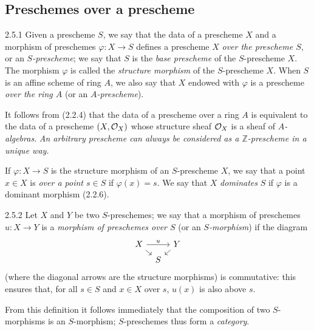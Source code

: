 \documentclass[../main.tex]{subfiles}
\begin{document}
\subsection{Preschemes over a prescheme}

\begin{cx}[Definition]{2.5.1}
    Given a prescheme $S$, we say that the data of a prescheme $X$ and a morphism of preschemes $\varphi\colon X\to S$ defines a prescheme $X$ \emph{over the prescheme $S$}, or an \emph{$S$-prescheme}; we say that $S$ is the \emph{base prescheme} of the $S$-prescheme $X$.
    The morphism $\varphi$ is called the \emph{structure morphism} of the $S$-prescheme $X$.
    When $S$ is an affine scheme of ring $A$, we also say that $X$ endowed with $\varphi$ is a prescheme \emph{over the ring $A$} (or an \emph{$A$-prescheme}).
\end{cx}

It follows from (2.2.4) that the data of a prescheme over a ring $A$ is equivalent to the data of a prescheme $(X,\mathcal{O}_X)$ whose structure sheaf $\mathcal{O}_X$ is a sheaf of \emph{$A$-algebras}.
\emph{An arbitrary prescheme can always be considered as a $\mathbb{Z}$-prescheme in a unique way.}

If $\varphi\colon X\to S$ is the structure morphism of an $S$-prescheme $X$, we say that a point $x\in X$ is \emph{over a point $s\in S$} if $\varphi(x)=s$.
We say that $X$ \emph{dominates} $S$ if $\varphi$ is a dominant morphism (2.2.6).

\begin{cx}{2.5.2}
    Let $X$ and $Y$ be two $S$-preschemes; we say that a morphism of preschemes $u\colon X\to Y$ is a \emph{morphism of preschemes over $S$} (or an \emph{$S$-morphism}) if the diagram
    \begin{equation*}
        \begin{tikzcd}[column sep=tiny, row sep=tiny]
            X \arrow[rr,"u"] \arrow[dr] & & Y \arrow[dl]\\
            & S &
        \end{tikzcd}
    \end{equation*}
    (where the diagonal arrows are the structure morphisms) is commutative: this ensures that, for all $s\in S$ and $x\in X$ over $s$, $u(x)$ is also above $s$.
\end{cx}

From this definition it follows immediately that the composition of two $S$-morphisms is an $S$-morphism; $S$-preschemes thus form a \emph{category}.
\end{document}
